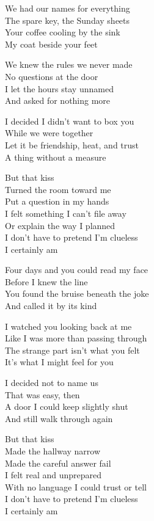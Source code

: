 \begin{lyrics}
We had our names for everything\\
The spare key, the Sunday sheets\\
Your coffee cooling by the sink\\
My coat beside your feet

We knew the rules we never made\\
No questions at the door\\
I let the hours stay unnamed\\
And asked for nothing more

I decided I didn't want to box you\\
While we were together\\
Let it be friendship, heat, and trust\\
A thing without a measure

But that kiss\\
Turned the room toward me\\
Put a question in my hands\\
I felt something I can't file away\\
Or explain the way I planned\\
I don't have to pretend I'm clueless\\
I certainly am

Four days and you could read my face\\
Before I knew the line\\
You found the bruise beneath the joke\\
And called it by its kind

I watched you looking back at me\\
Like I was more than passing through\\
The strange part isn't what you felt\\
It's what I might feel for you

I decided not to name us\\
That was easy, then\\
A door I could keep slightly shut\\
And still walk through again

But that kiss\\
Made the hallway narrow\\
Made the careful answer fail\\
I felt real and unprepared\\
With no language I could trust or tell\\
I don't have to pretend I'm clueless\\
I certainly am


\end{lyrics}
